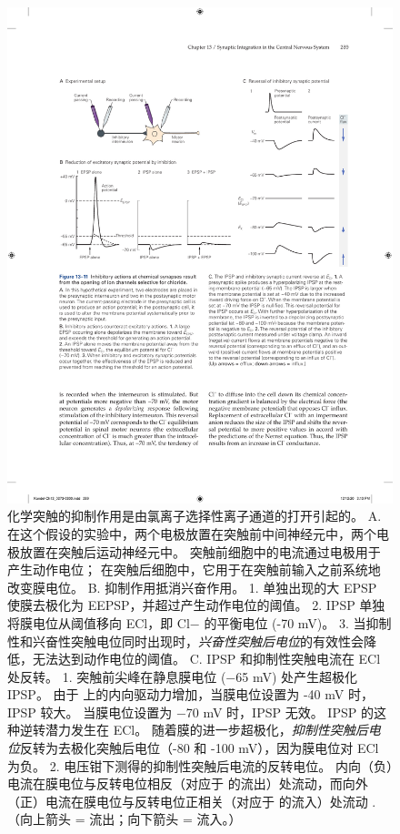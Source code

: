 \begin{figure}[htbp]
	\centering
	\includegraphics[width=0.95\linewidth]{chap13/fig_13_11}
	\caption{化学突触的抑制作用是由氯离子选择性离子通道的打开引起的。 A. 在这个假设的实验中，两个电极放置在突触前中间神经元中，两个电极放置在突触后运动神经元中。 突触前细胞中的电流通过电极用于产生动作电位； 在突触后细胞中，它用于在突触前输入之前系统地改变膜电位。 B. 抑制作用抵消兴奋作用。 1. 单独出现的大 EPSP 使膜去极化为 EEPSP，并超过产生动作电位的阈值。 2. IPSP 单独将膜电位从阈值移向 ECl，即 Cl− 的平衡电位 (-70 mV)。 3. 当抑制性和兴奋性突触电位同时出现时，\textit{兴奋性突触后电位}的有效性会降低，无法达到动作电位的阈值。 C. IPSP 和抑制性突触电流在 ECl 处反转。 1. 突触前尖峰在静息膜电位 (−65 mV) 处产生超极化 IPSP。 由于  上的内向驱动力增加，当膜电位设置为 -40 mV 时，IPSP 较大。 当膜电位设置为 −70 mV 时，IPSP 无效。 IPSP 的这种逆转潜力发生在 ECl。 随着膜的进一步超极化，\textit{抑制性突触后电位}反转为去极化突触后电位（-80 和 -100 mV），因为膜电位对 ECl 为负。 2. 电压钳下测得的抑制性突触后电流的反转电位。 内向（负）电流在膜电位与反转电位相反（对应于  的流出）处流动，而向外（正）电流在膜电位与反转电位正相关（对应于  的流入）处流动 . （向上箭头 = 流出；向下箭头 = 流入。）}
	\label{fig:13_11}
\end{figure}


